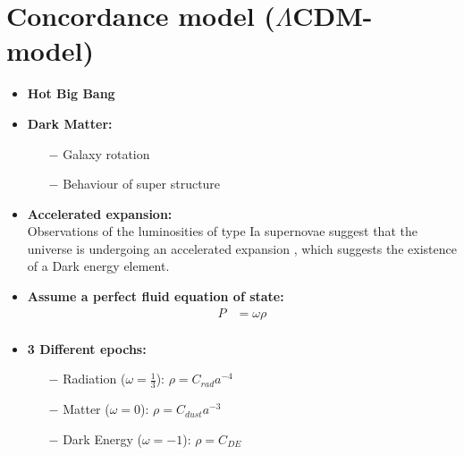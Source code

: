 \documentclass[8pt,hideothersubsections]{beamer}
\begin{document}
\section{Concordance model ($\Lambda$CDM-model)}
\begin{frame}
\begin{itemize}
\frametitle{\insertsectionhead}
\item \textbf{Hot Big Bang}
\item \textbf{Dark Matter:}
\begin{itemize}
\item[$-$] Galaxy rotation\\
\hspace{2pt}
\item[$-$] Behaviour of super structure\\
\end{itemize}
\item \textbf{Accelerated expansion:}\\
Observations of the luminosities of type Ia supernovae suggest that the universe is undergoing an accelerated expansion \citep{NPSNe, RMCGAU}, which suggests the existence of a Dark energy element.
\item \textbf{Assume a perfect fluid equation of state:}
\begin{equation}\label{eq:PFEoS}
\begin{split}
P &= \omega\rho         \\
\end{split}
\end{equation}
\item \textbf{3 Different epochs:}
\begin{itemize}
\item[$-$] Radiation ($\omega=\frac{1}{3}$): $\rho=C_{rad}a^{-4}$ \\
\hspace{2pt}
\item[$-$] Matter ($\omega=0$): $\rho=C_{dust}a^{-3}$ \\
\hspace{2pt}
\item[$-$] Dark Energy ($\omega=-1$): $\rho=C_{DE}$\\
\end{itemize}

\end{itemize}
\end{frame}
\end{document}
